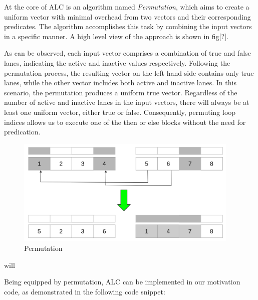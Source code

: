 \documentclass[\main/thesis.tex]{subfiles}
\begin{document}
At the core of ALC is an algorithm named \emph{Permutation}, which aims to create a uniform vector with minimal overhead from two vectors and their corresponding predicates. The algorithm accomplishes this task by combining the input vectors in a specific manner. A high level view of the approach is shown in fig[?].

As can be observed, each input vector comprises a combination of true and false lanes, indicating the active and inactive values respectively. Following the permutation process, the resulting vector on the left-hand side contains only true lanes, while the other vector includes both active and inactive lanes. In this scenario, the permutation produces a uniform true vector. Regardless of the number of active and inactive lanes in the input vectors, there will always be at least one uniform vector, either true or false. Consequently, permuting loop indices allows us to execute one of the then or else blocks without the need for predication.


\begin{figure}[t!]
    \centering
    \includegraphics[width=0.95\textwidth]{img/permutation.png}
    \caption{Permutation}
    \label{fig:Permutation}
\end{figure}will

Being equipped by permutation, ALC can be implemented in our motivation code, as demonstrated in the following code snippet:
\end{document}
